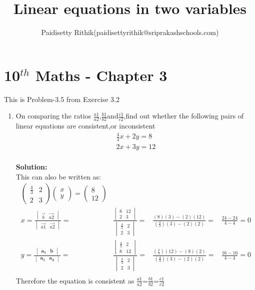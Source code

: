 \documentclass[12pt]{article}
\title{Linear equations in two variables}
\author{Paidisetty Rithik(paidisettyrithik@sriprakashschools.com)}
\newcommand{\myvec}[1]{\ensuremath{\begin{pmatrix}#1\end{pmatrix}}}
\newcommand{\mydet}[1]{\ensuremath{\begin{vmatrix}#1\end{vmatrix}}}
\newcommand{\solution}{\noindent \textbf{Solution: }}
\let\vec\mathbf
\begin{document}
\maketitle
\section*{10$^{th}$ Maths - Chapter 3}
This is Problem-3.5 from Exercise 3.2
\begin{enumerate}
\item On comparing the ratios $\frac{a1}{a2}$,$\frac{b1}{b2}$and$\frac{c1}{c2}$,find out whether the following pairs of linear equations are consistent,or inconsistent\\
\begin{align}
    \frac{4}{3}x+2y=8\\
       2x+3y=12\\
\end{align}

\solution \\
This can also be written as:
\begin{align}
\myvec{\frac{4}{3}&2\\2&3}\myvec{x\\y} =\myvec{8\\12} \\
x=\frac{\mydet{\Vec{b} & \Vec{a2}}}{\mydet{ \Vec{a1} & \Vec{a2}}} =&
\frac{\mydet{ 8 & 12 \\ 2 & 3}}{\mydet{\frac{4}{3}&2\\2&3}}=&
\frac{(8)(3)-(2)(12)}{(\frac{4}{3})(3)-(2)(2)}=&
\frac{24-24}{4-4}=0\\
y=\frac{\mydet{\vec{a_1}&\vec{b}}}{\mydet{\vec{a_1}&\vec{a_2}}} =&
\frac{\mydet{\frac{4}{3}&2\\8&12}}{\mydet{\frac{4}{3}&2\\2&3}}=&
\frac{(\frac{4}{3})(12)-(8)(2)}{(\frac{4}{3})(3)-(2)(2)}=&
\frac{16-16}{4-4}=0\\    
\end{align}
Therefore the equation is consistent as $\frac{a1}{a2}$=$\frac{b1}{b2}$=$\frac{c1}{c2}$
	

\end{enumerate}
\end{document}
